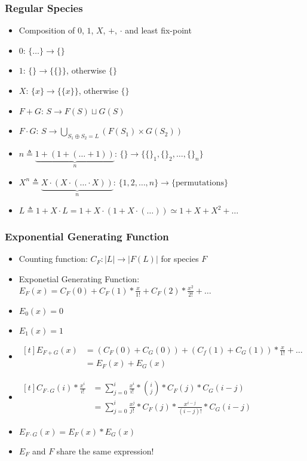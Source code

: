 \begin{frame}
\frametitle{Regular Species}

\begin{itemize}
\item Composition of $0$, $1$, $X$, $+$, $\cdot$ and least fix-point
\item $0$: $\{\dots\} \rightarrow \{\}$
\item $1$: $\{\} \rightarrow \{\{\}\}$, otherwise $\{\}$
\item $X$: $\{x\} \rightarrow \{\{x\}\}$, otherwise $\{\}$
\item $F + G$: $S \rightarrow F(S) \sqcup G(S)$
\item $F \cdot G$: $S \rightarrow \bigcup\limits_{S_1 \oplus S_2=L}(F(S_1) \times G(S_2))$
\item $n \triangleq \underbrace{1 + (1 + (\ldots + 1))}_n$:
$\{\} \rightarrow \{\{\}_1, \{\}_2, \ldots, \{\}_n\}$
\item $X^n \triangleq \underbrace{X \cdot (X \cdot (\ldots \cdot X))}_n$:
$\{1, 2, \ldots, n\} \rightarrow \{\text{permutations}\}$
\item $L \triangleq 1 + X \cdot L = 1 + X \cdot (1 + X \cdot (\ldots)) \simeq 1 + X + X^2 + \ldots$
\end{itemize}
\end{frame}

\begin{frame}
\frametitle{Exponential Generating Function}

\begin{itemize}
\item Counting function: $C_F: |L| \rightarrow |F(L)|$ for species $F$
\item Exponetial Generating Function: $E_F(x) = C_F(0) + C_F(1)*\frac{x}{1!} + C_F(2)*\frac{x^2}{2!} + \ldots$
\item $E_0(x) = 0$
\item $E_1(x) = 1$
\item
$\begin{aligned}[t]
E_{F+G}(x) &= (C_F(0)+C_G(0)) + (C_f(1)+C_G(1))*\frac{x}{1!} + \ldots\\
&= E_F(x) + E_G(x)
\end{aligned}$

\item $
\begin{aligned}[t]
C_{F\cdot G}(i)*\frac{x^i}{i!} 
&= \sum\limits_{j=0}^i \frac{x^i}{i!} * \binom{i}{j}*C_F(j)*C_G(i-j)\\
&= \sum\limits_{j=0}^i \frac{x^j}{j!}*C_F(j) * \frac{x^{i-j}}{(i-j)!}*C_G(i-j)
\end{aligned}$
\item $E_{F\cdot G}(x) = E_F(x) * E_G(x)$
\item $E_F$ and $F$ share the same expression!
\end{itemize}
\end{frame}

